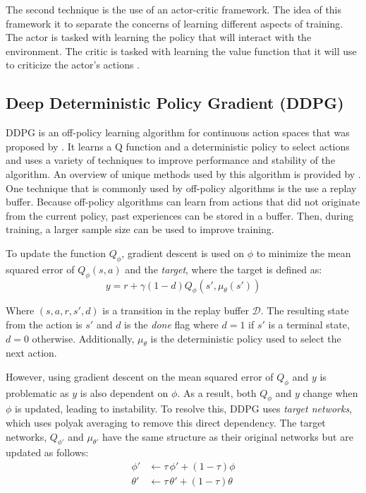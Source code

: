 \documentclass[conference]{IEEEtran}
\begin{document}
The second technique is the use of an actor-critic framework. The idea of this framework it to separate the concerns of learning different aspects of training. The actor is tasked with learning the policy that will interact with the environment. The critic is tasked with learning the value function that it will use to criticize the actor's actions \cite{deepmind_slides_9}.

\subsection{Deep Deterministic Policy Gradient (DDPG)}

DDPG is an off-policy learning algorithm for continuous action spaces that was proposed by \cite{DDPG}. It learns a Q function and a deterministic policy to select actions and uses a variety of techniques to improve performance and stability of the algorithm. An overview of unique methods used by this algorithm is provided by \cite{spinning_up_ddpg}. One technique that is commonly used by off-policy algorithms is the use a replay buffer. Because off-policy algorithms can learn from actions that did not originate from the current policy, past experiences can be stored in a buffer. Then, during training, a larger sample size can be used to improve training.

To update the function $Q_\phi$, gradient descent is used on $\phi$ to minimize the mean squared error of $Q_\phi(s, a)$ and the \textit{target}, where the target is defined as:
$$
    y = r + \gamma(1-d)Q_\phi(s', \mu_\theta(s'))
$$

Where $(s, a, r, s', d)$ is a transition in the replay buffer $\mathcal{D}$. The resulting state from the action is $s'$ and $d$ is the \textit{done} flag where $d=1$ if $s'$ is a terminal state, $d=0$ otherwise. Additionally, $\mu_\theta$ is the deterministic policy used to select the next action.

However, using gradient descent on the mean squared error of $Q_\phi$ and $y$ is problematic as $y$ is also dependent on $\phi$. As a result, both $Q_\phi$ and $y$ change when $\phi$ is updated, leading to instability. To resolve this, DDPG uses \textit{target networks}, which uses polyak averaging to remove this direct dependency. The target networks, $Q_{\phi'}$ and $\mu_{\theta'}$ have the same structure as their original networks but are updated as follows:
\begin{align*}
    \phi'   & \leftarrow \tau \, \phi' + (1 - \tau) \phi     \\
    \theta' & \leftarrow \tau \, \theta' + (1 - \tau) \theta
\end{align*}
\end{document}
